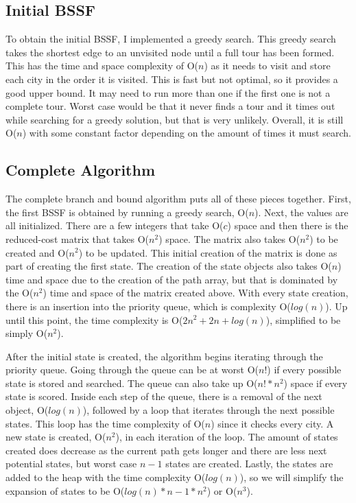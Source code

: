 \documentclass[11pt]{report} %
\begin{document}
\subsection*{Initial BSSF}
To obtain the initial BSSF, I implemented a greedy search.  This greedy search takes the shortest edge to an unvisited node until a full tour has been formed.  This has the time and space complexity of O($n$) as it needs to visit and store each city in the order it is visited.  This is fast but not optimal, so it provides a good upper bound.  It may need to run more than one if the first one is not a complete tour.  Worst case would be that it never finds a tour and it times out while searching for a greedy solution, but that is very unlikely.  Overall, it is still O($n$) with some constant factor depending on the amount of times it must search.


\subsection*{Complete Algorithm}
The complete branch and bound algorithm puts all of these pieces together.  First, the first BSSF is obtained by running a greedy search, O($n$). Next, the values are all initialized.  There are a few integers that take O($c$) space and then there is the reduced-cost matrix that takes O($n^2$) space.  The matrix also takes O($n^2$) to be created and O($n^2$) to be updated.  This initial creation of the matrix is done as part of creating the first state.  The creation of the state objects also takes O($n$) time and space due to the creation of the path array, but that is dominated by the O($n^2$) time and space of the matrix created above.  With every state creation, there is an insertion into the priority queue, which is complexity O($log(n)$).  Up until this point, the time complexity is O($2n^2 + 2n + log(n)$), simplified to be simply O($n^2$).

After the initial state is created, the algorithm begins iterating through the priority queue.  Going through the queue can be at worst O($n!$) if every possible state is stored and searched.  The queue can also take up O($n! * n^2$) space if every state is scored.  Inside each step of the queue, there is a removal of the next object, O($log(n)$), followed by a loop that iterates through the next possible states.  This loop has the time complexity of O($n$) since it checks every city.  A new state is created, O($n^2$), in each iteration of the loop.  The amount of states created does decrease as the current path gets longer and there are less next potential states, but worst case $n-1$ states are created.  Lastly, the states are added to the heap with the time complexity O($log(n)$), so we will simplify the expansion of states to be O($log(n) * n-1 * n^2$) or O($n^3$).
\end{document}
